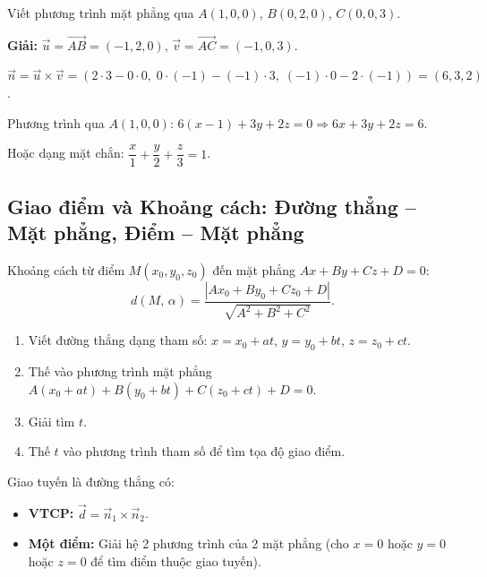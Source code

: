 \documentclass[12pt,a4paper]{article}
\begin{document}
\begin{vidu}
  Viết phương trình mặt phẳng qua $A(1,0,0)$, $B(0,2,0)$, $C(0,0,3)$.

  \medskip\textbf{Giải:}
  $\vec{u} = \overrightarrow{AB} = (-1,2,0)$, $\vec{v} = \overrightarrow{AC} = (-1,0,3)$.

  $\vec{n} = \vec{u}\times\vec{v} = (2\cdot3-0\cdot0,\; 0\cdot(-1)-(-1)\cdot3,\; (-1)\cdot0-2\cdot(-1)) = (6,3,2)$.

  Phương trình qua $A(1,0,0)$: $6(x-1)+3y+2z=0 \Rightarrow 6x+3y+2z=6$.

  Hoặc dạng mặt chắn: $\dfrac{x}{1}+\dfrac{y}{2}+\dfrac{z}{3}=1$.
\end{vidu}

\subsection{Giao điểm và Khoảng cách: Đường thẳng -- Mặt phẳng, Điểm -- Mặt phẳng}

\begin{congthuc}[title={Khoảng cách từ điểm đến mặt phẳng}]
  Khoảng cách từ điểm $M(x_0, y_0, z_0)$ đến mặt phẳng $Ax+By+Cz+D=0$:
  \[
    d(M,\, \alpha) = \frac{|Ax_0 + By_0 + Cz_0 + D|}{\sqrt{A^2 + B^2 + C^2}}.
  \]
\end{congthuc}

\begin{phuongphap}[title={Tìm giao điểm của đường thẳng và mặt phẳng}]
  \begin{enumerate}
    \item Viết đường thẳng dạng tham số: $x=x_0+at$, $y=y_0+bt$, $z=z_0+ct$.
    \item Thế vào phương trình mặt phẳng $A(x_0+at)+B(y_0+bt)+C(z_0+ct)+D=0$.
    \item Giải tìm $t$.
    \item Thế $t$ vào phương trình tham số để tìm tọa độ giao điểm.
  \end{enumerate}
\end{phuongphap}

\begin{phuongphap}[title={Tìm giao tuyến của hai mặt phẳng}]
  Giao tuyến là đường thẳng có:
  \begin{itemize}
    \item \textbf{VTCP:} $\vec{d} = \vec{n}_1 \times \vec{n}_2$.
    \item \textbf{Một điểm:} Giải hệ 2 phương trình của 2 mặt phẳng (cho $x=0$ hoặc $y=0$ hoặc $z=0$ để tìm điểm thuộc giao tuyến).
  \end{itemize}
\end{phuongphap}
\end{document}
